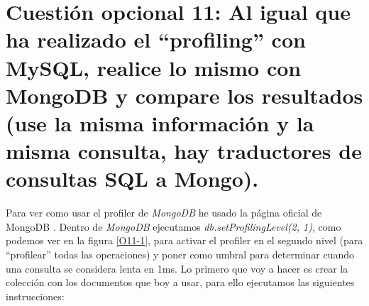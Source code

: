 \documentclass[a4paper,titlepage,12pt]{scrartcl}	%
\numberwithin{figure}{section} %
\numberwithin{table}{section} %
\begin{document}
	\section[Cuestión opcional 11: Al igual que ha realizado el “profiling” con MySQL, realice lo mismo con MongoDB y compare los resultados (use la misma información y la misma consulta, hay traductores de consultas SQL a Mongo).]{Cuestión opcional 11: Al igual que ha realizado el “profiling” con MySQL, realice lo mismo con MongoDB y compare los resultados (use la misma información y la misma consulta, hay traductores de consultas SQL a Mongo).}
	
	Para ver como usar el profiler de \textit{MongoDB} he usado la página oficial de MongoDB \cite{mongodb_profiler}. Dentro de \textit{MongoDB} ejecutamos \textit{db.setProfilingLevel(2, 1)}, como podemos ver en la figura \ref{O11-1}, para activar el profiler en el segundo nivel (para ``profilear'' todas las operaciones) y poner como umbral para determinar cuando una consulta se considera lenta en 1ms. Lo primero que voy a hacer es crear la colección con los documentos que boy a usar, para ello ejecutamos las siguientes instrucciones:
\end{document}
